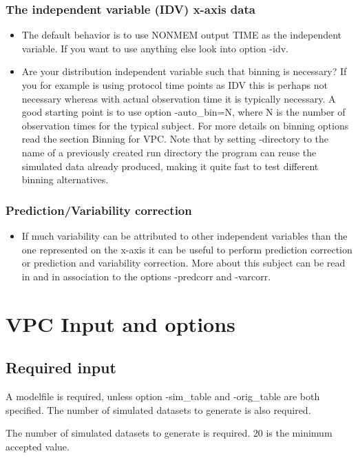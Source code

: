 \subsubsection*{The independent variable (IDV) x-axis data}

\begin{itemize}
\item The default behavior is to use NONMEM output TIME as the independent variable. If you want to use anything else look into option -idv.
\item Are your distribution independent variable such that binning is necessary? If you for example is using protocol time points as IDV this is perhaps not necessary whereas with actual observation time it is typically necessary. A good starting point is to use option -auto\_bin=N, where N is the number of observation times for the typical subject. For more details on binning options read the section Binning for VPC. Note that by setting -directory to the name of a previously created run directory the program can reuse the simulated data already produced, making it quite fast to test different binning alternatives.
\end{itemize}

\subsubsection*{Prediction/Variability correction}

\begin{itemize}
	\item If much variability can be attributed to other independent variables than the one represented on the x-axis it can be useful to perform prediction correction or prediction and variability correction. More about this subject can be read in \cite{Bergstrand} and in association to the options -predcorr and -varcorr.
\end{itemize}

\section{VPC Input and options}
\subsection{Required input}
A modelfile is required, unless option -sim\_table and -orig\_table are both specified. 
The number of simulated datasets to generate is also required.
\begin{optionlist}
The number of simulated datasets to generate is required. 20 is the minimum accepted value. 
\nextopt
\end{optionlist}

